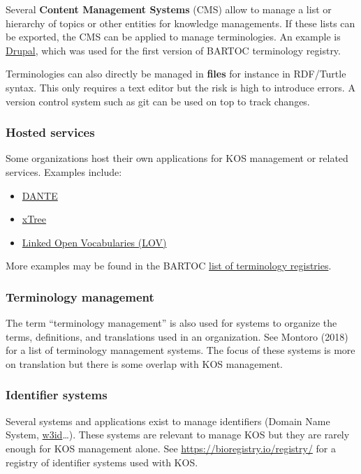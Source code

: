 \documentclass[
  DIV=10]{article}
\providecommand{\tightlist}{%
  \setlength{\itemsep}{0pt}\setlength{\parskip}{0pt}}
\begin{document}
Several \textbf{Content Management Systems} (CMS) allow to manage a list
or hierarchy of topics or other entities for knowledge managements. If
these lists can be exported, the CMS can be applied to manage
terminologies. An example is \href{https://www.drupal.org/}{Drupal},
which was used for the first version of BARTOC terminology registry.

Terminologies can also directly be managed in \textbf{files} for
instance in RDF/Turtle syntax. This only requires a text editor but the
risk is high to introduce errors. A version control system such as git
can be used on top to track changes.

\subsubsection{Hosted services}\label{hosted-services}

Some organizations host their own applications for KOS management or
related services. Examples include:

\begin{itemize}
\tightlist
\item
  \href{https://doi.org/10.11588/akmb.2018.1.63475}{DANTE}
\item
  \href{https://xtree-public.digicult-verbund.de/}{xTree}
\item
  \href{http://lov.okfn.org/dataset/lov/}{Linked Open Vocabularies
  (LOV)}
\end{itemize}

More examples may be found in the BARTOC
\href{https://bartoc.org/registries}{list of terminology registries}.

\subsubsection{Terminology management}\label{terminology-management}

The term ``terminology management'' is also used for systems to organize
the terms, definitions, and translations used in an organization. See
Montoro (2018) for a list of terminology management systems. The focus
of these systems is more on translation but there is some overlap with
KOS management.

\subsubsection{Identifier systems}\label{identifier-systems}

Several systems and applications exist to manage identifiers (Domain
Name System, \href{https://w3id.org/}{w3id}\ldots). These systems are
relevant to manage KOS but they are rarely enough for KOS management
alone. See \url{https://bioregistry.io/registry/} for a registry of
identifier systems used with KOS.
\end{document}
